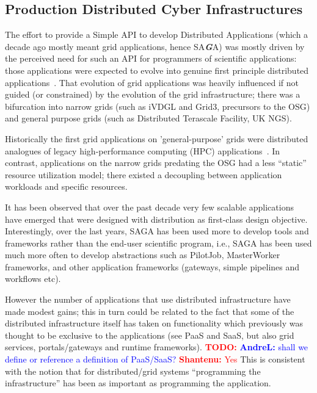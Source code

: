 \documentclass[]{article}
\newcommand{\B}[1]{\textbf{#1}}
\newcommand{\BI}[1]{\textbf{\textit{#1}}}
\newcommand{\todo}[1]{{\textcolor{red}{\B{TODO:} #1 }}}
\newcommand{\jhanote}[1]{{\textcolor{red}{     \B{Shantenu:} #1 }}}
\newcommand{\alnote}[1]{{\textcolor{blue}{    \B{AndreL:  } #1 }}}
\newcommand{\todo}[1]{}
\newcommand{\jhanote}[1]{}
\newcommand{\alnote}[1]{}
\begin{document}
 \subsection{Production Distributed Cyber Infrastructures}

  The effort to provide a Simple API to develop Distributed Applications
  (which a decade ago mostly meant grid applications, hence SA\BI{G}A)
  was mostly driven by the perceived need for such an API for
  programmers of scientific applications: those applications were
  expected to evolve into genuine first principle distributed
  applications~\cite{gat}.  That evolution of grid applications was
  heavily influenced if not guided (or constrained) by the evolution of
  the grid infrastructure; there was a bifurcation into narrow grids
  (such as iVDGL and Grid3, precursors to the OSG) and general purpose
  grids (such as Distributed Terascale Facility, UK NGS).

  Historically the first grid applications on 'general-purpose' grids
  were distributed analogues of legacy high-performance computing (HPC)
  applications~\cite{dpagrid2009}. In contrast, applications on the
  narrow grids predating the OSG had a less ``static'' resource
  utilization model; there existed a decoupling between application
  workloads and specific resources\cite{boinc}.

  It has been observed that over the past decade very few
  scalable applications have emerged that were designed with 
  distribution as first-class design objective. Interestingly,
  over the last years, SAGA has been used more to develop
  tools and frameworks rather than the end-user scientific program,
  i.e., SAGA has been used much more often to develop abstractions such
  as PilotJob, MasterWorker frameworks, and other application frameworks
  (gateways, simple pipelines and workflows etc).

  However the number of applications that use distributed infrastructure
  have made modest gains; this in turn could be related to the fact that
  some of the distributed infrastructure itself has taken on
  functionality which previously was thought to be exclusive to the
  applications (see PaaS and SaaS, but also grid services,
  portals/gateways and runtime frameworks). \todo{}\alnote{shall we
  define or reference a definition of PaaS/SaaS?}\jhanote{Yes} This is
  consistent with the notion that for distributed/grid systems
  ``programming the infrastructure'' has been as important as
  programming the application.
\end{document}
